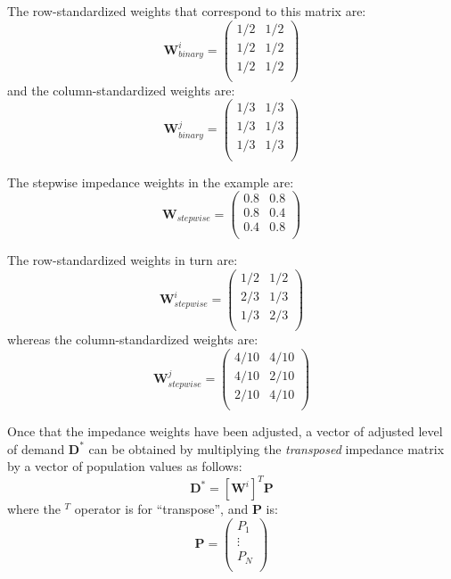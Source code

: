 \documentclass[10pt,letterpaper]{article}
\begin{document}
The row-standardized weights that correspond to this matrix are: \[
\mathbf{W}^{i}_{binary} = \left(\begin{array}{ccc}
            1/2 & 1/2\\
            1/2 & 1/2\\
            1/2 & 1/2\\
        \end{array}
        \right)
\] and the column-standardized weights are: \[
\mathbf{W}^{j}_{binary} = \left(\begin{array}{ccc}
            1/3 & 1/3\\
            1/3 & 1/3\\
            1/3 & 1/3\\
        \end{array}
        \right)
\]

The stepwise impedance weights in the example are: \[
\mathbf{W}_{stepwise} = \left(\begin{array}{ccc}
            0.8 & 0.8\\
            0.8 & 0.4\\
            0.4 & 0.8\\
        \end{array}
        \right)
\]

The row-standardized weights in turn are: \[
\mathbf{W}^{i}_{stepwise} = \left(\begin{array}{ccc}
            1/2 & 1/2\\
            2/3 & 1/3\\
            1/3 & 2/3\\
        \end{array}
        \right)
\] whereas the column-standardized weights are: \[
\mathbf{W}^{j}_{stepwise} = \left(\begin{array}{ccc}
            4/10 & 4/10\\
            4/10 & 2/10\\
            2/10 & 4/10\\
        \end{array}
        \right)
\]

Once that the impedance weights have been adjusted, a vector of adjusted
level of demand \(\mathbf{D}^*\) can be obtained by multiplying the
\emph{transposed} impedance matrix by a vector of population values as
follows: \[
\mathbf{D}^* = [\mathbf{W}^{i}]^T\mathbf{P}
\] where the \(^T\) operator is for ``transpose'', and \(\mathbf{P}\)
is: \[
\mathbf{P} = \left(\begin{array}{c}
            P_1\\
            \vdots\\
            P_N\\
        \end{array}
        \right) 
\]
\end{document}
